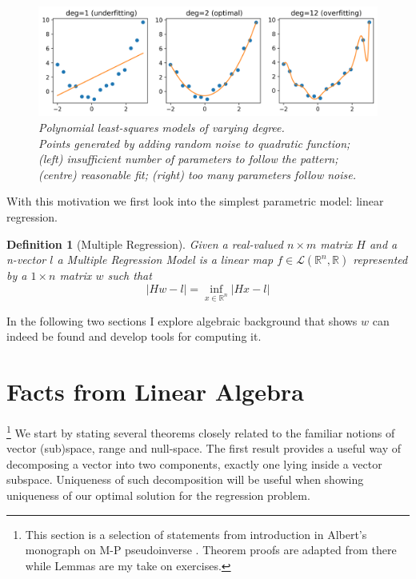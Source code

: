 \documentclass[a4paper]{article}
\theoremstyle{break}
\newtheorem{definition}{Definition}[section]
\newcommand{\R}{\mathbb{R}}
\begin{document}
\begin{figure}[b]
\centering
\captionsetup{width=0.8\linewidth}
\includegraphics[width=0.8\linewidth]{polyfit.png}
\caption[]{
    \textit{Polynomial least-squares models of varying degree. \\
    Points generated by adding random noise to quadratic function;
    (left) insufficient number of parameters to follow the pattern;
    (centre) reasonable fit;
    (right) too many parameters follow noise.}
}
\end{figure} 

With this motivation we first look into the simplest parametric model: linear regression.

\begin{definition}[Multiple Regression]
    Given a real-valued $ n \times m$ matrix $H$ and a n-vector $l$ a Multiple Regression Model is a linear map $f \in \mathcal{L} ( \R ^n, \R)$ represented by a $ 1 \times n$ matrix $w$ such that
    \begin{equation}\label{def2}
        | H w - l | = \inf\limits_{x \in \R^n} | H x - l |
    \end{equation}
\end{definition}

In the following two sections I explore algebraic background that shows $ w $ can indeed be found and develop tools for computing it.

\pagebreak
\section{Facts from Linear Algebra}

\footnote{This section is a selection of statements from introduction in Albert's monograph on M-P pseudoinverse \cite[pp6-12]{albert}. Theorem proofs are adapted from there while Lemmas are my take on exercises.}
%
We start by stating several theorems closely related to the familiar notions of vector (sub)space, range and null-space. The first result provides a useful way of decomposing a vector into two components, exactly one lying inside a vector subspace. Uniqueness of such decomposition will be useful when showing uniqueness of our optimal solution for the regression problem.
\end{document}
